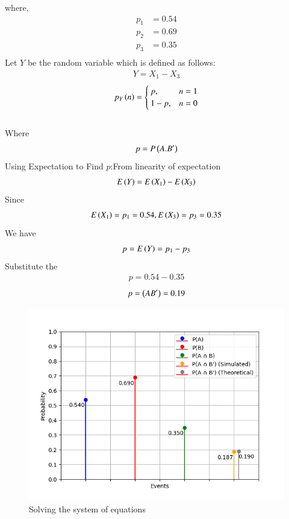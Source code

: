 \documentclass[journal]{IEEEtran}
\begin{document}
where,
\begin{align}
	p_1 &= 0.54\\
	p_2 &= 0.69\\
	p_3 &= 0.35\\
\end{align}
Let $Y$ be the random variable which is defined as follows:
\begin{align}
	Y = X_1 - X_3
\end{align}
\begin{align}
	p_{Y}\left(n\right)=
	\begin{cases}
		p ,& n = 1\\
		1 - p ,& n = 0
	\end{cases}
\end{align}\\
Where
\begin{align}
    p = P\left(A.B'\right)
\end{align}
Using Expectation to Find $p$:From linearity of expectation
\begin{align}
    E\left(Y\right)=E\left(X_{1}\right) - E\left(X_3\right)
\end{align}
Since
\begin{align}
    E\left(X_{1}\right)=p_{1}=0.54,E\left(X_{3}\right)=p_{3}=0.35
\end{align}
We have
\begin{align}
    p=E\left(Y\right)=p_{1}-p_{3}
\end{align}
Substitute the
\begin{align}
    p=0.54-0.35
\end{align}
\begin{align}
    p=\left(AB'\right)=0.19
\end{align}
\begin{figure}[h!]
   \centering
   \includegraphics[width=1\columnwidth]{figure/fig.png}
   \caption{Solving the system of equations}
   \label{stemplot}
\end{figure}


 
\end{document}
